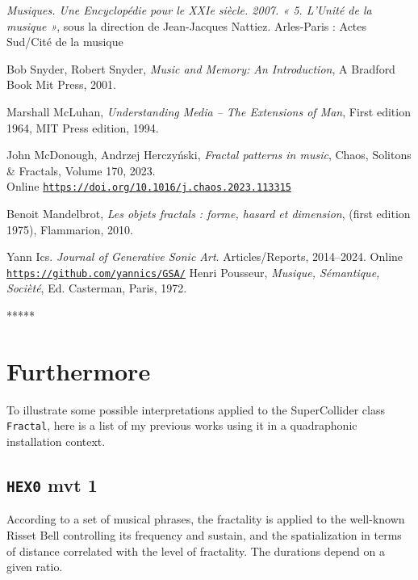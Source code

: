 \documentclass{article}
\begin{document}
\begin{thebibliography}{2}

\textit{Musiques. Une Encyclopédie pour le XXIe siècle. 2007. « 5. L’Unité de la musique »}, sous la direction de Jean-Jacques Nattiez. Arles-Paris : Actes Sud/Cité de la musique

Bob Snyder, Robert Snyder,
\textit{Music and Memory: An Introduction},
A Bradford Book Mit Press, 2001.

Marshall McLuhan,
\textit{Understanding Media -- The Extensions of Man},
First edition 1964, MIT Press edition, 1994.

John McDonough, Andrzej Herczyński,
\textit{Fractal patterns in music},
Chaos, Solitons \& Fractals,
Volume 170,
2023. \\Online
\href{https://doi.org/10.1016/j.chaos.2023.113315}{\texttt{https://doi.org/10.1016/j.chaos.2023.113315}}

Benoit Mandelbrot,
\textit{Les objets fractals : forme, hasard et dimension}, (first edition 1975), Flammarion, 2010. 

	Yann Ics. \textit{Journal of Generative Sonic Art}. Articles/Reports, 2014--2024. Online
	\href{https://github.com/yannics/GSA/}{\texttt{https://github.com/yannics/GSA/}}
Henri Pousseur,
\textit{Musique, Sémantique, Socièté}, Ed. Casterman, Paris, 1972. 

\end{thebibliography}

\bigskip

\begin{center}
*****
\end{center}
\smallskip



\section*{Furthermore}
To illustrate some possible interpretations applied to the SuperCollider class \texttt{Fractal},  
here is a list of my previous works using it in a quadraphonic installation context. 

\smallskip

\subsection*{\texttt{HEX0} mvt 1 \textnormal{\cite[Section 8.2]{yx}}}
\vspace{-1mm}
According to a set of musical phrases, the fractality is applied to the well-known Risset Bell controlling its frequency and sustain, and the spatialization in terms of distance correlated with the level of fractality. The durations depend on a given ratio. 
\vspace{-1mm}
\end{document}
